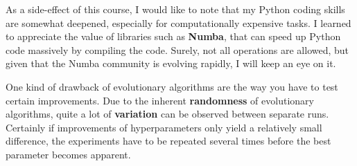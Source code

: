 \documentclass[a4paper,10pt]{article}
\newcommand{\ReplaceMe}[1]{{\color{blue}#1}}
\begin{document}
As a side-effect of this course, I would like to note that my Python coding skills are somewhat deepened, especially for computationally expensive tasks. I learned to appreciate the value of libraries such as \textbf{Numba}, that can speed up Python code massively by compiling the code. Surely, not all operations are allowed, but given that the Numba community is evolving rapidly, I will keep an eye on it.

One kind of drawback of evolutionary algorithms are the way you have to test certain improvements. Due to the inherent \textbf{randomness} of evolutionary algorithms, quite a lot of \textbf{variation} can be observed between separate runs. Certainly if improvements of hyperparameters only yield a relatively small difference, the experiments have to be repeated several times before the best parameter becomes apparent.



 

\end{document}
